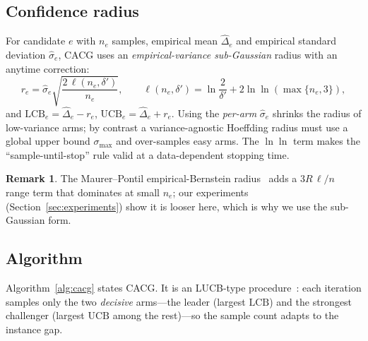 \documentclass[11pt]{article}
\theoremstyle{plain}
\theoremstyle{definition}
\newtheorem{remark}{Remark}
\newcommand{\LCB}{\mathrm{LCB}}
\newcommand{\UCB}{\mathrm{UCB}}
\begin{document}
\subsection{Confidence radius}\label{sec:radius}
For candidate $e$ with $n_e$ samples, empirical mean $\widehat\Delta_e$ and
empirical standard deviation $\widehat\sigma_e$, CACG uses an
\emph{empirical-variance sub-Gaussian} radius with an anytime correction:
\[
r_e=\widehat\sigma_e\sqrt{\frac{2\,\ell(n_e,\delta')}{n_e}},
\qquad
\ell(n_e,\delta')=\ln\frac{2}{\delta'}+2\ln\ln(\max\{n_e,3\}),
\]
and $\LCB_e=\widehat\Delta_e-r_e$, $\UCB_e=\widehat\Delta_e+r_e$. Using the
\emph{per-arm} $\widehat\sigma_e$ shrinks the radius of low-variance arms;
by contrast a variance-agnostic Hoeffding radius must use a global upper
bound $\sigma_{\max}$ and over-samples easy arms. The $\ln\ln$ term makes
the ``sample-until-stop'' rule valid at a data-dependent stopping time.
\begin{remark}
The Maurer--Pontil empirical-Bernstein radius~\cite{MaurerPontil2009,Audibert2009}
adds a $3R\,\ell/n$ range term that dominates at small $n_e$; our
experiments (Section~\ref{sec:experiments}) show it is looser here, which
is why we use the sub-Gaussian form.
\end{remark}

\subsection{Algorithm}
Algorithm~\ref{alg:cacg} states CACG. It is an LUCB-type
procedure~\cite{Kalyanakrishnan2012}: each iteration samples only the two
\emph{decisive} arms---the leader (largest $\LCB$) and the strongest
challenger (largest $\UCB$ among the rest)---so the sample count adapts to
the instance gap.
\end{document}
